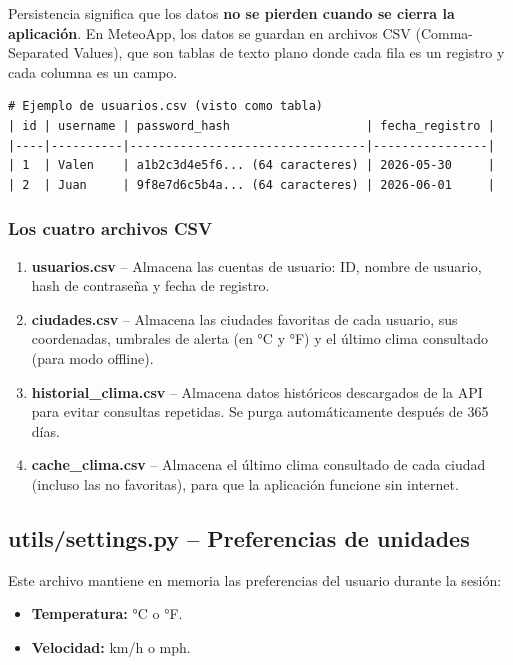\documentclass[12pt,a4paper]{article}
\begin{document}
Persistencia significa que los datos \textbf{no se pierden cuando se cierra la aplicación}. En MeteoApp, los datos se guardan en archivos CSV (Comma-Separated Values), que son tablas de texto plano donde cada fila es un registro y cada columna es un campo.

\begin{lstlisting}[frame=none, numbers=none, basicstyle=\ttfamily\small]
# Ejemplo de usuarios.csv (visto como tabla)
| id | username | password_hash                   | fecha_registro |
|----|----------|---------------------------------|----------------|
| 1  | Valen    | a1b2c3d4e5f6... (64 caracteres) | 2026-05-30     |
| 2  | Juan     | 9f8e7d6c5b4a... (64 caracteres) | 2026-06-01     |
\end{lstlisting}

\subsubsection*{Los cuatro archivos CSV}

\begin{enumerate}
    \item \textbf{usuarios.csv} -- Almacena las cuentas de usuario: ID, nombre de usuario, hash de contraseña y fecha de registro.
    \item \textbf{ciudades.csv} -- Almacena las ciudades favoritas de cada usuario, sus coordenadas, umbrales de alerta (en °C y °F) y el último clima consultado (para modo offline).
    \item \textbf{historial\_clima.csv} -- Almacena datos históricos descargados de la API para evitar consultas repetidas. Se purga automáticamente después de 365 días.
    \item \textbf{cache\_clima.csv} -- Almacena el último clima consultado de cada ciudad (incluso las no favoritas), para que la aplicación funcione sin internet.
\end{enumerate}

\subsection{utils/settings.py -- Preferencias de unidades}

Este archivo mantiene en memoria las preferencias del usuario durante la sesión:

\begin{itemize}
    \item \textbf{Temperatura:} °C o °F.
    \item \textbf{Velocidad:} km/h o mph.
\end{itemize}
\end{document}

